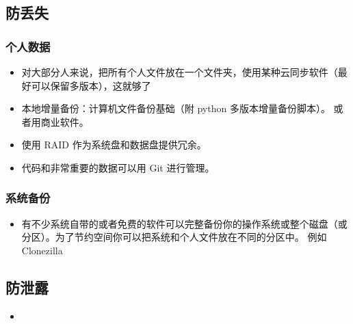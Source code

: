 
\subsection{防丢失}
\subsubsection{个人数据}
\begin{itemize}
\item 对大部分人来说，把所有个人文件放在一个文件夹，使用某种云同步软件（最好可以保留多版本），这就够了
\item 本地增量备份：计算机文件备份基础（附 python 多版本增量备份脚本）。 或者用商业软件。
\item 使用 RAID 作为系统盘和数据盘提供冗余。
\item 代码和非常重要的数据可以用 Git 进行管理。
\end{itemize}

\subsubsection{系统备份}
\begin{itemize}
\item 有不少系统自带的或者免费的软件可以完整备份你的操作系统或整个磁盘（或分区）。为了节约空间你可以把系统和个人文件放在不同的分区中。 例如 Clonezilla
\end{itemize}

\subsection{防泄露}
\begin{itemize}
\item 
\end{itemize}
